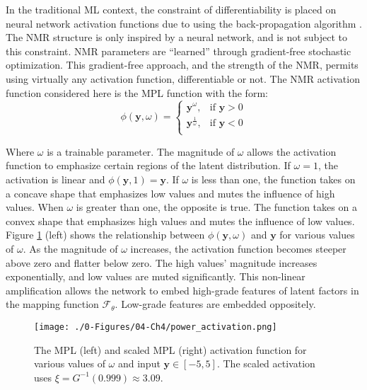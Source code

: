 In the traditional \gls{ML} context, the constraint of differentiability is placed on neural network activation functions due to using the back-propagation algorithm \citep{rojas1996backpropagation}. The \gls{NMR} structure is only inspired by a neural network, and is not subject to this constraint. \Gls{NMR} parameters are ``learned'' through gradient-free stochastic optimization. This gradient-free approach, and the strength of the \gls{NMR}, permits using virtually any activation function, differentiable or not. The \gls{NMR} activation function considered here is the \acrfull{MPL} function with the form:
\begin{equation}
    \phi \left( \mathbf{y}, \omega \right) =
    \begin{cases}
        \mathbf{y}^{\omega},           & \text{if $\mathbf{y} > 0$} \\
        \mathbf{y}^{\frac{1}{\omega}}, & \text{if $\mathbf{y} < 0$} \\
    \end{cases}
    \label{eq:power}
\end{equation}


Where $\omega$ is a trainable parameter. The magnitude of $\omega$ allows the activation function to emphasize certain regions of the latent distribution. If $\omega = 1$, the activation is linear and $\phi \left( \mathbf{y}, 1 \right)=\mathbf{y}$. If $\omega$ is less than one, the function takes on a concave shape that emphasizes low values and mutes the influence of high values. When $\omega$ is greater than one, the opposite is true. The function takes on a convex shape that emphasizes high values and mutes the influence of low values. Figure \ref{fig:power_activation} (left) shows the relationship between $\phi \left( \mathbf{y}, \omega \right)$ and $\mathbf{y}$ for various values of $\omega$. As the magnitude of $\omega$ increases, the activation function becomes steeper above zero and flatter below zero. The high values' magnitude increases exponentially, and low values are muted significantly. This non-linear amplification allows the network to embed high-grade features of latent factors in the mapping function $\mathcal{F}_{\theta}$. Low-grade features are embedded oppositely.

\begin{figure}[htb!]
    \centering
    \texttt{[image: ./0-Figures/04-Ch4/power\_activation.png]}
    \caption{The \gls{MPL} (left) and scaled \gls{MPL} (right) activation function for various values of $\omega$ and input $\mathbf{y} \in [-5,5]$. The scaled activation uses $\xi = G^{-1}(0.999) \approx 3.09$. }
    \label{fig:power_activation}
\end{figure}

